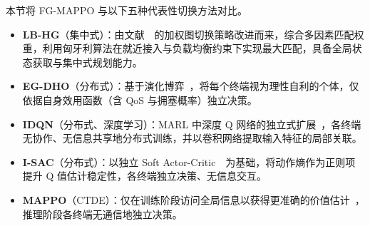 \begin{table}[!htp]
  \centering
  \label{tab:ch3_scenario_params}
\end{table}

本节将 FG-MAPPO 与以下五种代表性切换方法对比。

\begin{itemize}
\item \textbf{LB-HG}（集中式）：由文献~\cite{lv-WeightedGraphHO-NetLett22}~的加权图切换策略改进而来，综合多因素匹配权重，利用匈牙利算法在就近接入与负载均衡约束下实现最大匹配，具备全局状态获取与集中式规划能力。
\item \textbf{EG-DHO}（分布式）：基于演化博弈~\cite{zhou-EvolutionaryGameHO-WCNC23}，将每个终端视为理性自利的个体，仅依据自身效用函数（含 QoS 与拥塞概率）独立决策。
\item \textbf{IDQN}（分布式、深度学习）：MARL 中深度 Q 网络的独立式扩展~\cite{liu-HO4LargeSat-VTC2022}，各终端无协作、无信息共享地分布式训练，并以卷积网络提取输入特征的局部关联。
\item \textbf{I-SAC}（分布式）：以独立 Soft Actor-Critic~\cite{haarnoja-SAC-ICML18}~为基础，将动作熵作为正则项提升 Q 值估计稳定性，各终端独立决策、无信息交互。
\item \textbf{MAPPO}（CTDE）：仅在训练阶段访问全局信息以获得更准确的价值估计~\cite{yu-MAPPO-NeurIPS22}，推理阶段各终端无通信地独立决策。
\end{itemize}

